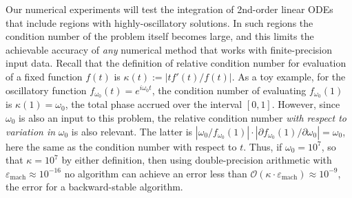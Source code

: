 \documentclass[10pt]{article}
\newcommand{\eg}{{\it e.g.\ }}
\newcommand{\bigO}{{\mathcal O}}
\newcommand{\om}{\omega}
\begin{document}
Our numerical experiments will test the integration of 2nd-order linear
ODEs that include regions with highly-oscillatory solutions.
In such regions the condition number of the problem itself becomes
large, and this limits the achievable accuracy of \emph{any}
numerical method that works with finite-precision input data.
Recall \cite[Ch.~6]{GCbook}
that the definition of relative condition number for evaluation
of a fixed function $f(t)$ is $\kappa(t) := |tf'(t)/f(t)|$.
As a toy example,
for the oscillatory function $f_{\omega_0}(t) = e^{i\om_0t}$, 
the condition number of evaluating $f_{\omega_0}(1)$ is $\kappa(1) = \om_0$,
the total phase accrued
over the interval $[0,1]$.
However, since $\om_0$ is also an input to this problem,
the relative condition number
\emph{with respect to variation in} $\om_0$ is also relevant.
The latter is
$|\om_0/f_{\om_0}(1)| \cdot |\partial f_{\om_0}(1)/\partial \om_0| = \om_0$,
here the same as the condition number with respect to $t$.
Thus, if $\om_0=10^{7}$, so that $\kappa=10^7$ by either %
definition,
then using double-precision arithmetic with
$\varepsilon_{\mathrm{mach}} \approx 10^{-16}$
no algorithm can achieve an error less than $\bigO(\kappa\cdot \varepsilon_{\mathrm{mach}}) \approx 10^{-9}$,
the error for a backward-stable algorithm.
\end{document}
